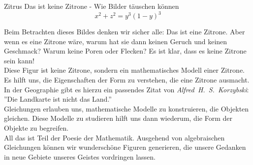 \begin{surferPage}{Zitrus}
Das ist keine Zitrone - Wie Bilder täuschen können\\
\smallskip
\[x^2 + z^2 = y^3 (1 - y)^3\] 


\singlespacing
Beim Betrachten dieses Bildes denken wir sicher alle: Das ist eine Zitrone. Aber wenn es eine Zitrone wäre, warum hat sie dann keinen Geruch und keinen Geschmack? Warum keine Poren oder Flecken? Es ist klar, dass es keine Zitrone sein kann!\\
\singlespacing
Diese Figur ist keine Zitrone, sondern ein mathematisches Modell einer Zitrone. Es hilft uns, die Eigenschaften der Form zu verstehen, die eine Zitrone ausmacht. In der Geographie gibt es hierzu ein passendes Zitat von \emph{Alfred\ H.\ S.\ Korzybski}: ''Die Landkarte ist nicht das Land.'' \\
\singlespacing
Gleichungen erlauben uns, mathematische Modelle zu konstruieren, die Objekten gleichen. Diese Modelle zu studieren hilft uns dann wiederum, die Form der Objekte zu begreifen.\\
\singlespacing
All das ist Teil der Poesie der Mathematik. Ausgehend von algebraischen Gleichungen können wir wunderschöne Figuren generieren, die unsere Gedanken in neue Gebiete unseres Geistes vordringen lassen.
\end{surferPage}
